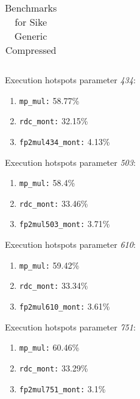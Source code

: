 \begin{table}[H]
\begin{tabular}{|K{2.5cm}|K{2.5cm}|K{2.5cm}|K{2.5cm}|K{2.5cm}|}
	\hline
	\end{tabular}
	\caption[Benchmarks for Sike Generic Compressed]{Benchmarks for Sike Generic Compressed}
	\label{tab:benchmarks_Sike_Generic_Compressed}
\end{table}
Execution hotspots parameter \textit{434}:
\begin{enumerate}[noitemsep]
	\item \texttt{mp\_mul:} 58.77\%
	\item \texttt{rdc\_mont:} 32.15\%
	\item \texttt{fp2mul434\_mont:} 4.13\%
\end{enumerate}
Execution hotspots parameter \textit{503}:
\begin{enumerate}[noitemsep]
	\item \texttt{mp\_mul:} 58.4\%
	\item \texttt{rdc\_mont:} 33.46\%
	\item \texttt{fp2mul503\_mont:} 3.71\%
\end{enumerate}
Execution hotspots parameter \textit{610}:
\begin{enumerate}[noitemsep]
	\item \texttt{mp\_mul:} 59.42\%
	\item \texttt{rdc\_mont:} 33.34\%
	\item \texttt{fp2mul610\_mont:} 3.61\%
\end{enumerate}
Execution hotspots parameter \textit{751}:
\begin{enumerate}[noitemsep]
	\item \texttt{mp\_mul:} 60.46\%
	\item \texttt{rdc\_mont:} 33.29\%
	\item \texttt{fp2mul751\_mont:} 3.1\%
\end{enumerate}
